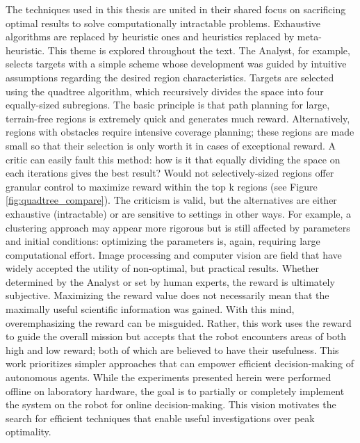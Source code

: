 \documentclass{tamuccthesis}
\begin{document}
The techniques used in this thesis are united in their shared focus on sacrificing optimal results to solve computationally intractable problems. Exhaustive algorithms are replaced by heuristic ones and heuristics replaced by meta-heuristic. This theme is explored throughout the text. The Analyst, for example, selects targets with a simple scheme whose development was guided by intuitive assumptions regarding the desired region characteristics. Targets are selected using the quadtree algorithm, which recursively divides the space into four equally-sized subregions. The basic principle is that path planning for large, terrain-free regions is extremely quick and generates much reward. Alternatively, regions with obstacles require intensive coverage planning; these regions are made small so that their selection is only worth it in cases of exceptional reward. A critic can easily fault this method: how is it that equally dividing the space on each iterations gives the best result? Would not selectively-sized regions offer granular control to maximize reward within the top k regions (see Figure \ref{fig:quadtree_compare}). The criticism is valid, but the alternatives are either exhaustive (intractable) or are sensitive to settings in other ways. For example, a clustering approach may appear more rigorous but is still affected by parameters and initial conditions: optimizing the parameters is, again, requiring large computational effort. Image processing and computer vision are field that have widely accepted the utility of non-optimal, but practical results. Whether determined by the Analyst or set by human experts, the reward is ultimately subjective. Maximizing the reward value does not necessarily mean that the maximally useful scientific information was gained. With this mind, overemphasizing the reward can be misguided. Rather, this work uses the reward to guide the overall mission but accepts that the robot encounters areas of both high and low reward; both of which are believed to have their usefulness. This work prioritizes simpler approaches that can empower efficient decision-making of autonomous agents.  While the experiments presented herein were performed offline on laboratory hardware, the goal is to partially or completely implement the system on the robot for online decision-making. This vision motivates the search for efficient techniques that enable useful investigations over peak optimality. 
\end{document}

